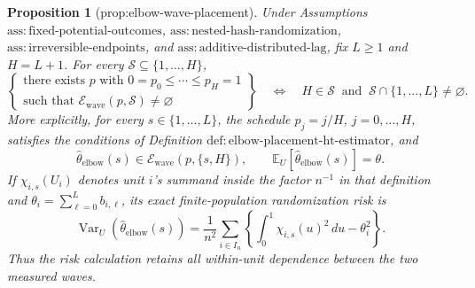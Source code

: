 \documentclass{article}
\newtheorem{proposition}{Proposition}
\begin{document}
\begin{proposition}[prop:elbow-wave-placement]\label{prop:elbow-wave-placement}
Under Assumptions \(\mathrm{ass:fixed\text{-}potential\text{-}outcomes}\), \(\mathrm{ass:nested\text{-}hash\text{-}randomization}\), \(\mathrm{ass:irreversible\text{-}endpoints}\), and \(\mathrm{ass:additive\text{-}distributed\text{-}lag}\), fix \(L\geq1\) and \(H=L+1\).  For every \(\mathcal S\subseteq\{1,\ldots,H\}\),
\[
 \left\{
 \begin{array}{c}
 \text{there exists }p\text{ with }0=p_0\leq\cdots\leq p_H=1\\
 \text{such that }\mathcal E_{\mathrm{wave}}(p,\mathcal S)\ne\varnothing
 \end{array}
 \right\}
 \quad\Longleftrightarrow\quad
 H\in\mathcal S\ \text{ and }\
 \mathcal S\cap\{1,\ldots,L\}\ne\varnothing.
\]
More explicitly, for every \(s\in\{1,\ldots,L\}\), the schedule \(p_j=j/H\), \(j=0,\ldots,H\), satisfies the conditions of Definition \(\mathrm{def:elbow\text{-}placement\text{-}ht\text{-}estimator}\), and
\[
 \widehat\theta_{\mathrm{elbow}}(s)\in
 \mathcal E_{\mathrm{wave}}(p,\{s,H\}),
 \qquad
 \mathbb E_U\!\left[\widehat\theta_{\mathrm{elbow}}(s)\right]=\theta.
\]
If \(\chi_{i,s}(U_i)\) denotes unit \(i\)'s summand inside the factor \(n^{-1}\) in that definition and \(\theta_i=\sum_{\ell=0}^{L}b_{i,\ell}\), its exact finite-population randomization risk is
\[
 \operatorname{Var}_U\!\left(\widehat\theta_{\mathrm{elbow}}(s)\right)
 =\frac1{n^2}\sum_{i\in I_n}
 \left\{\int_0^1\chi_{i,s}(u)^2\,du-\theta_i^2\right\}.
\]
Thus the risk calculation retains all within-unit dependence between the two measured waves.
\end{proposition}
\end{document}
